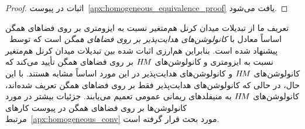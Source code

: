\begin{proof}
    اثبات در پیوست~\ref{apx:homogeneous_equivalence_proof} یافت می‌شود.
\end{proof}
تعریف ما از تبدیلات میدان کرنل هم‌متغیر نسبت به ایزومتری بر روی فضاهای همگن اساساً معادل با \emph{کانولوشن‌های هدایت‌پذیر بر روی فضاهای همگن} است که توسط~\citet{Cohen2018-intertwiners}\cite{Cohen2019-generaltheory} پیشنهاد شده است.
بنابراین هم‌ارزی اثبات شده بین تبدیلات میدان کرنل هم‌متغیر نسبت به ایزومتری و کانولوشن‌های $H\mkern-2.5muM$ بر روی فضاهای همگن تأیید می‌کند که کانولوشن‌های $H\mkern-2.5muM$ و کانولوشن‌های هدایت‌پذیر در این مورد اساساً مشابه هستند.
با این حال، در حالی که کانولوشن‌های هدایت‌پذیر فقط بر روی فضاهای همگن تعریف شده‌اند، کانولوشن‌های $H\mkern-2.5muM$ به منیفلدهای ریمانی عمومی تعمیم می‌یابند.
جزئیات بیشتر در مورد کانولوشن‌ها بر روی فضاهای همگن در پیوست کارهای مرتبط~\ref{apx:homogeneous_conv} مورد بحث قرار گرفته است.